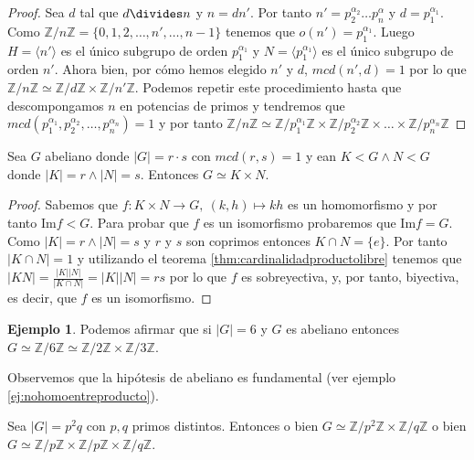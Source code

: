 \documentclass{book}
\theoremstyle{definition}
\newtheorem{ej}{Ejemplo}
\theoremstyle{remark}
\newcommand{\ima}{\text{Im}}
\newcommand{\isom}{\simeq}
\newcommand{\Z}{\mathbb{Z}}
\newcommand{\ZnZ}{\mathbb{Z}/n\mathbb{Z}}
\begin{document}
\begin{proof}
	Sea $d$ tal que $d \divides n$ y $n = dn'$. Por tanto $n' = p_2^{\alpha_2}\dots p_n^{\alpha}$ y $d = p_1^{\alpha_1}$. Como $\ZnZ = \{0, 1, 2, \dots, n', \dots, n-1\}$ tenemos que $o(n') = p_1^{\alpha_1}$. Luego $H = \langle n' \rangle$ es el único subgrupo de orden $p_1^{\alpha_1}$ y $N = \langle p_1^{\alpha_1} \rangle$ es el único subgrupo de orden $n'$. Ahora bien, por cómo hemos elegido $n'$ y $d$, $mcd(n', d) = 1$ por lo que $\ZnZ \isom \Z/d\Z \times \Z/n'\Z$. Podemos repetir este procedimiento hasta que descompongamos $n$ en potencias de primos y tendremos que $mcd(p_1^{\alpha_1}, p_2^{\alpha_2}, \dots, p_n^{\alpha_n}) = 1$ y por tanto $\ZnZ \isom \Z/p_1^{\alpha_1}\Z \times \Z/p_2^{\alpha_2}\Z \times \dots \times \Z/p_n^{\alpha_n}\Z$
\end{proof}

\begin{thm}
	Sea $G$ abeliano donde $|G| = r\cdot s$ con $mcd(r,s) = 1$ y ean $K < G \land N < G$ donde $|K| = r \land |N| = s$. Entonces $G \isom K \times N$.
\end{thm}

\begin{proof}
	Sabemos que $f:K\times N \to G,\ (k, h) \mapsto kh$ es un homomorfismo y por tanto $\ima f < G$. Para probar que $f$ es un isomorfismo probaremos que $\ima f = G$. Como $|K| = r \land |N| = s$ y $r$ y $s$ son coprimos entonces $K \cap N = \{e\}$. Por tanto $|K \cap N| = 1$ y utilizando el teorema \ref{thm:cardinalidadproductolibre} tenemos que $|KN| = \frac{|K||N|}{|K \cap N|} = |K| |N| = rs$ por lo que $f$ es sobreyectiva, y, por tanto, biyectiva, es decir, que $f$ es un isomorfismo.
\end{proof}

\begin{ej}
	Podemos afirmar que si $|G| = 6$ y $G$ es abeliano entonces $G \isom \Z/6\Z \isom \Z/2\Z \times \Z/3\Z$.
\end{ej}

Observemos que la hipótesis de abeliano es fundamental (ver ejemplo \ref{ej:nohomoentreproducto}).


\bigskip


Sea $|G| = p^2q$ con $p,q$ primos distintos. Entonces o bien $G \isom \Z/p^2\Z \times \Z/q\Z$ o bien $G \isom \Z/p\Z \times \Z/p\Z \times \Z/q\Z$. %
\end{document}
